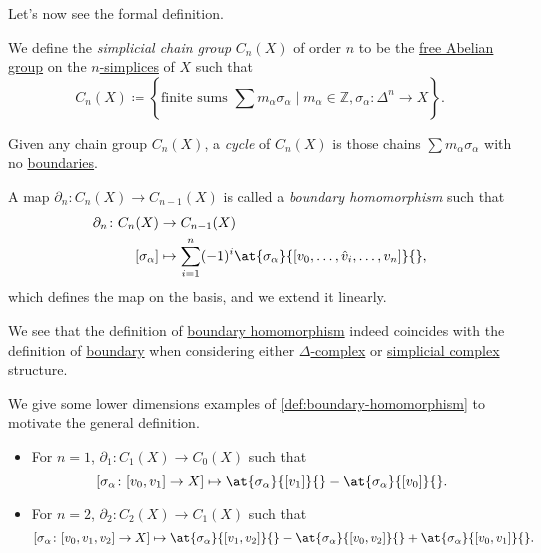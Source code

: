 Let's now see the formal definition.
\begin{definition}\label{def:simplicial-chain-group}
	We define the \emph{simplicial chain group} \(C_{n} (X)\) of order \(n\) to be the \hyperref[def:free-Abelian-group]{free Abelian group} on the \hyperref[def:standard-simplex]{\(n\)-simplices} of \(X\) such that
	\[
		C_{n} (X) \coloneqq \left\{\text{finite sums } \sum\limits_{}^{} m_\alpha \sigma _\alpha \mid m_\alpha \in \mathbb{Z} , \sigma _\alpha \colon \Delta ^n \to X\right\}.
	\]
\end{definition}

\begin{definition}[Cycle]\label{def:cycle}
	Given any chain group \(C_{n} (X)\), a \emph{cycle} of \(C_{n} (X)\) is those chains \(\sum m_\alpha \sigma _\alpha\) with no \hyperref[def:boundary]{boundaries}.
\end{definition}

\begin{definition}\label{def:boundary-homomorphism}
	A map \(\partial_{n} \colon C_{n} (X)\to C_{n-1}(X) \) is called a \emph{boundary homomorphism} such that
	\[
		\begin{split}
			\partial_{n} \colon C_{n} (X) & \to C_{n-1}(X)                                                                                         \\
			[\sigma _\alpha ]             & \mapsto \sum\limits_{i=1}^{n} (-1)^i \at{\sigma _\alpha}{[v_0, \dots , \hat{v}_{i}, \dots , v_{n}]}{},
		\end{split}
	\]
	which defines the map on the basis, and we extend it linearly.
\end{definition}
\begin{remark}
	We see that the definition of \hyperref[def:boundary-homomorphism]{boundary homomorphism} indeed coincides with the definition of \hyperref[def:boundary]{boundary} when considering either \hyperref[def:delta-complex]{\(\Delta\)-complex} or \hyperref[def:simplicial-complex]{simplicial complex} structure.
\end{remark}

\begin{eg}
	We give some lower dimensions examples of \autoref{def:boundary-homomorphism} to motivate the general definition.
	\begin{itemize}
		\item For \(n=1\), \(\partial_1\colon C_1(X)\to C_0(X)\) such that
		      \[
			      [\sigma _\alpha \colon [v_0, v_1]\to X]\mapsto \at{\sigma _\alpha }{[v_1]}{} - \at{\sigma _\alpha }{[v_0]}{}.
		      \]
		\item For \(n=2\), \(\partial_2\colon C_2(X)\to C_1(X)\) such that
		      \[
			      [\sigma _\alpha \colon [v_0, v_1, v_2]\to X]\mapsto \at{\sigma _\alpha }{[v_1,v_2]}{} - \at{\sigma _\alpha }{[v_0, v_2]}{} + \at{\sigma _\alpha }{[v_0, v_1]}{}.
		      \]
	\end{itemize}
\end{eg}

